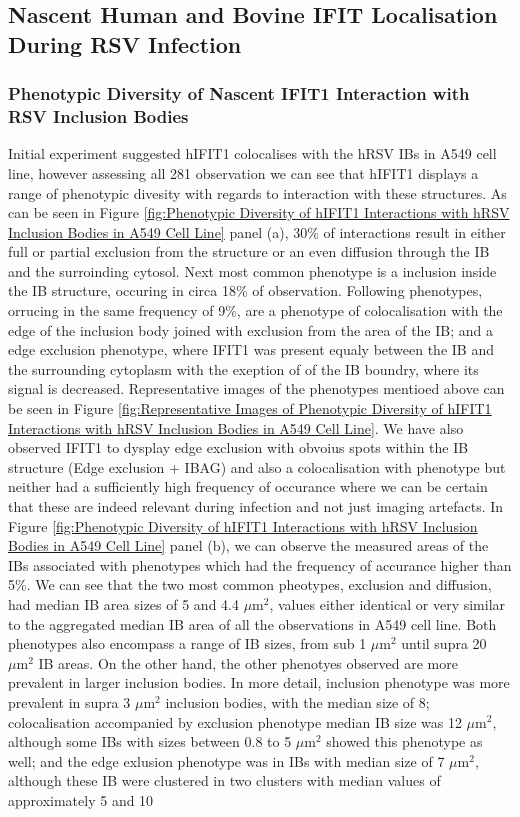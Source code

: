 \subsection{Nascent Human and Bovine IFIT Localisation During RSV Infection} \label{subsec:Nascent Human and Bovine IFIT Localisation During RSV Infection}
\subsubsection{Phenotypic Diversity of Nascent IFIT1 Interaction with RSV Inclusion Bodies}
Initial experiment suggested hIFIT1 colocalises with the hRSV IBs in A549 cell line, however assessing all 281 observation we can see that hIFIT1 displays a range of phenotypic divesity with regards to interaction with these structures. As can be seen in Figure \ref{fig:Phenotypic Diversity of hIFIT1 Interactions with hRSV Inclusion Bodies in A549 Cell Line} panel (a), 30\% of interactions result in either full or partial exclusion from the structure or an even diffusion through the IB and the surroinding cytosol. Next most common phenotype is a inclusion inside the IB structure, occuring in circa 18\% of observation. Following phenotypes, orrucing in the same frequency of 9\%, are a phenotype of colocalisation with the edge of the inclusion body joined with exclusion from the area of the IB; and a edge exclusion phenotype, where IFIT1 was present equaly between the IB and the surrounding cytoplasm with the exeption of of the IB boundry, where its signal is decreased. Representative images of the phenotypes mentioed above can be seen in Figure \ref{fig:Representative Images of Phenotypic Diversity of hIFIT1 Interactions with hRSV Inclusion Bodies in A549 Cell Line}. We have also observed IFIT1 to dysplay edge exclusion with obvoius spots within the IB structure (Edge exclusion + IBAG) and also a colocalisation with phenotype but neither had a sufficiently high frequency of occurance where we can be certain that these are indeed relevant during infection and not just imaging artefacts. In Figure \ref{fig:Phenotypic Diversity of hIFIT1 Interactions with hRSV Inclusion Bodies in A549 Cell Line} panel (b), we can observe the measured areas of the IBs associated with phenotypes which had the frequency of accurance higher than 5\%. We can see that the two most common pheotypes, exclusion and diffusion, had median IB area sizes of 5 and 4.4 \(\mu \mbox{m}^2\), values either identical or very similar to the aggregated median IB area of all the observations in A549 cell line. Both phenotypes also encompass a range of IB sizes, from sub 1 \(\mu \mbox{m}^2\) until supra 20 \(\mu \mbox{m}^2\) IB areas. On the other hand, the other phenotyes observed are more prevalent in larger inclusion bodies. In more detail, inclusion phenotype was more prevalent in supra 3 \(\mu \mbox{m}^2\) inclusion bodies, with the median size of 8; colocalisation accompanied by exclusion phenotype median IB size was 12 \(\mu \mbox{m}^2\), although some IBs with sizes between 0.8 to 5 \(\mu \mbox{m}^2\) showed this phenotype as well; and the edge exlusion phenotype was in IBs with median size of 7 \(\mu \mbox{m}^2\), although these IB were clustered in two clusters with median values of approximately 5 and 10 